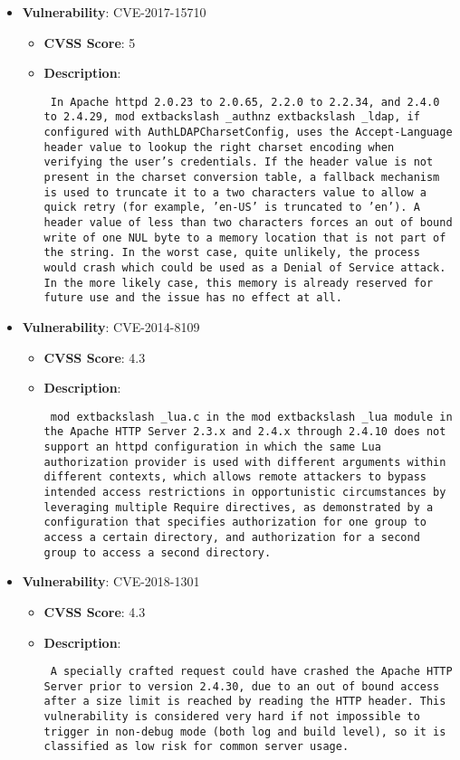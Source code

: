 \documentclass{article}
\begin{document}
\begin{itemize}
        \item \textbf{Vulnerability}: CVE-2017-15710
        \begin{itemize}
            \item \textbf{CVSS Score}:  5 
            \item \textbf{Description}: \parbox{\linewidth}{\texttt{ In Apache httpd 2.0.23 to 2.0.65, 2.2.0 to 2.2.34, and 2.4.0 to 2.4.29, mod	extbackslash _authnz	extbackslash _ldap, if configured with AuthLDAPCharsetConfig, uses the Accept-Language header value to lookup the right charset encoding when verifying the user's credentials. If the header value is not present in the charset conversion table, a fallback mechanism is used to truncate it to a two characters value to allow a quick retry (for example, 'en-US' is truncated to 'en'). A header value of less than two characters forces an out of bound write of one NUL byte to a memory location that is not part of the string. In the worst case, quite unlikely, the process would crash which could be used as a Denial of Service attack. In the more likely case, this memory is already reserved for future use and the issue has no effect at all. }}
        \end{itemize}
    
        \item \textbf{Vulnerability}: CVE-2014-8109
        \begin{itemize}
            \item \textbf{CVSS Score}:  4.3 
            \item \textbf{Description}: \parbox{\linewidth}{\texttt{ mod	extbackslash _lua.c in the mod	extbackslash _lua module in the Apache HTTP Server 2.3.x and 2.4.x through 2.4.10 does not support an httpd configuration in which the same Lua authorization provider is used with different arguments within different contexts, which allows remote attackers to bypass intended access restrictions in opportunistic circumstances by leveraging multiple Require directives, as demonstrated by a configuration that specifies authorization for one group to access a certain directory, and authorization for a second group to access a second directory. }}
        \end{itemize}
    
        \item \textbf{Vulnerability}: CVE-2018-1301
        \begin{itemize}
            \item \textbf{CVSS Score}:  4.3 
            \item \textbf{Description}: \parbox{\linewidth}{\texttt{ A specially crafted request could have crashed the Apache HTTP Server prior to version 2.4.30, due to an out of bound access after a size limit is reached by reading the HTTP header. This vulnerability is considered very hard if not impossible to trigger in non-debug mode (both log and build level), so it is classified as low risk for common server usage. }}
        \end{itemize}
    

\end{itemize}
\end{document}
